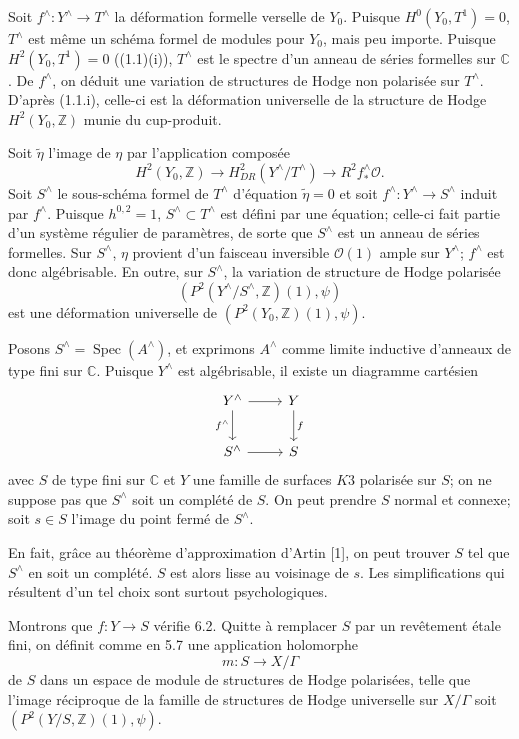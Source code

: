 \documentclass[10pt]{article}
\newcommand{\C}{\mathbb{C}}
\newcommand{\Z}{\mathbb{Z}}
\newcommand{\Spec}{\operatorname{Spec}}
\begin{document}
Soit $f^\wedge:Y^\wedge\to T^\wedge$ la déformation formelle verselle de $Y_0$. Puisque $H^0(Y_0,T^1)=0$, $T^\wedge$ est même un schéma formel de modules pour $Y_0$, mais peu importe. Puisque $H^2(Y_0,T^1)=0$ ((1.1)(i)), $T^\wedge$ est le spectre d'un anneau de séries formelles sur $\C$. De $f^\wedge$, on déduit une variation de structures de Hodge non polarisée sur $T^\wedge$. D'après (1.1.i), celle-ci est la déformation universelle de la structure de Hodge $H^2(Y_0,\Z)$ munie du cup-produit.

Soit $\tilde\eta$ l'image de $\eta$ par l'application composée
\[
H^2(Y_0,\Z)\longrightarrow H^2_{DR}(Y^\wedge/T^\wedge)\longrightarrow R^2f^\wedge_*\mathcal O.
\]
Soit $S^\wedge$ le sous-schéma formel de $T^\wedge$ d'équation $\tilde\eta=0$ et soit $f^\wedge:Y^\wedge\to S^\wedge$ induit par $f^\wedge$. Puisque $h^{0,2}=1$, $S^\wedge\subset T^\wedge$ est défini par une équation; celle-ci fait partie d'un système régulier de paramètres, de sorte que $S^\wedge$ est un anneau de séries formelles. Sur $S^\wedge$, $\eta$ provient d'un faisceau inversible $\mathcal O(1)$ ample sur $Y^\wedge$; $f^\wedge$ est donc algébrisable. En outre, sur $S^\wedge$, la variation de structure de Hodge polarisée
\[
(P^2(Y^\wedge/S^\wedge,\Z)(1),\psi)
\]
est une déformation universelle de $(P^2(Y_0,\Z)(1),\psi)$.

Posons $S^\wedge=\Spec(A^\wedge)$, et exprimons $A^\wedge$ comme limite inductive d'anneaux de type fini sur $\C$. Puisque $Y^\wedge$ est algébrisable, il existe un diagramme cartésien
\[
\begin{tikzcd}[column sep=2.4em,row sep=2.2em]
Y^\wedge \arrow[r] \arrow[d,"f^\wedge"'] & Y \arrow[d,"f"]\\
S^\wedge \arrow[r] & S
\end{tikzcd}
\]
avec $S$ de type fini sur $\C$ et $Y$ une famille de surfaces $K3$ polarisée sur $S$; on ne suppose pas que $S^\wedge$ soit un complété de $S$. On peut prendre $S$ normal et connexe; soit $s\in S$ l'image du point fermé de $S^\wedge$.

En fait, grâce au théorème d'approximation d'Artin [1], on peut trouver $S$ tel que $S^\wedge$ en soit un complété. $S$ est alors lisse au voisinage de $s$. Les simplifications qui résultent d'un tel choix sont surtout psychologiques.

Montrons que $f:Y\to S$ vérifie 6.2. Quitte à remplacer $S$ par un revêtement étale fini, on définit comme en 5.7 une application holomorphe
\[
m:S\longrightarrow X/\Gamma
\]
de $S$ dans un espace de module de structures de Hodge polarisées, telle que l'image réciproque de la famille de structures de Hodge universelle sur $X/\Gamma$ soit $(P^2(Y/S,\Z)(1),\psi)$.
\end{document}
